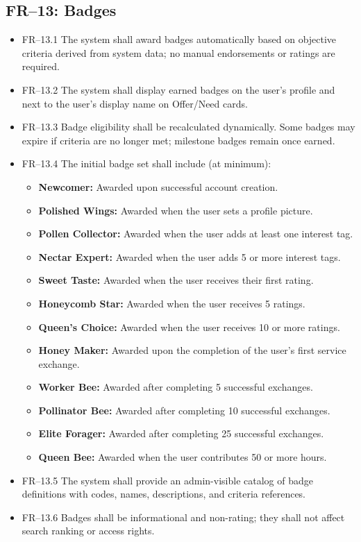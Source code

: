 \documentclass[11pt,a4paper]{report}
\begin{document}
\subsection{FR--13: Badges}
\begin{itemize}
    \item FR--13.1 The system shall award badges automatically based on objective criteria derived from system data; no manual endorsements or ratings are required.
    \item FR--13.2 The system shall display earned badges on the user's profile and next to the user's display name on Offer/Need cards.
    \item FR--13.3 Badge eligibility shall be recalculated dynamically. Some badges may expire if criteria are no longer met; milestone badges remain once earned.
    \item FR--13.4 The initial badge set shall include (at minimum):
          \begin{itemize}
              \item \textbf{Newcomer:} Awarded upon successful account creation.
              \item \textbf{Polished Wings:} Awarded when the user sets a profile picture.
              \item \textbf{Pollen Collector:} Awarded when the user adds at least one interest tag.
              \item \textbf{Nectar Expert:} Awarded when the user adds 5 or more interest tags.
              \item \textbf{Sweet Taste:} Awarded when the user receives their first rating.
              \item \textbf{Honeycomb Star:} Awarded when the user receives 5 ratings.
              \item \textbf{Queen's Choice:} Awarded when the user receives 10 or more ratings.
              \item \textbf{Honey Maker:} Awarded upon the completion of the user's first service exchange.
              \item \textbf{Worker Bee:} Awarded after completing 5 successful exchanges.
              \item \textbf{Pollinator Bee:} Awarded after completing 10 successful exchanges.
              \item \textbf{Elite Forager:} Awarded after completing 25 successful exchanges.
              \item \textbf{Queen Bee:} Awarded when the user contributes 50 or more hours.
          \end{itemize}
    \item FR--13.5 The system shall provide an admin-visible catalog of badge definitions with codes, names, descriptions, and criteria references.
    \item FR--13.6 Badges shall be informational and non-rating; they shall not affect search ranking or access rights.
\end{itemize}
\end{document}
